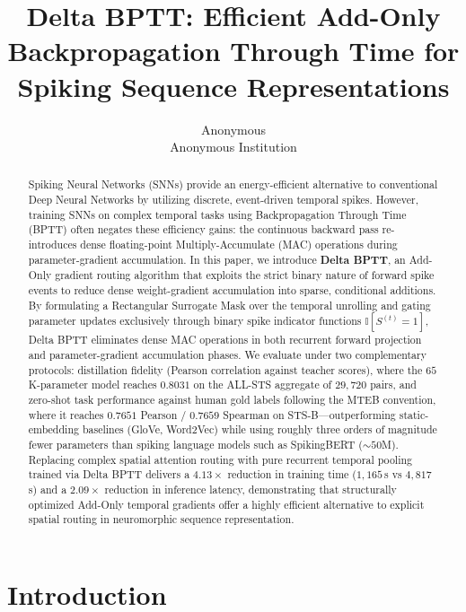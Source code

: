 \documentclass[10pt]{article} %
\title{Delta BPTT: Efficient Add-Only Backpropagation Through Time for Spiking Sequence Representations}
\author{\name Anonymous \\
      \addr Anonymous Institution}
\begin{document}
\maketitle

\begin{abstract}
Spiking Neural Networks (SNNs) provide an energy-efficient alternative to conventional Deep Neural Networks by utilizing discrete, event-driven temporal spikes. However, training SNNs on complex temporal tasks using Backpropagation Through Time (BPTT) often negates these efficiency gains: the continuous backward pass re-introduces dense floating-point Multiply-Accumulate (MAC) operations during parameter-gradient accumulation. In this paper, we introduce \textbf{Delta BPTT}, an Add-Only gradient routing algorithm that exploits the strict binary nature of forward spike events to reduce dense weight-gradient accumulation into sparse, conditional additions. By formulating a Rectangular Surrogate Mask over the temporal unrolling and gating parameter updates exclusively through binary spike indicator functions $\mathbb{I}[S^{(t)}=1]$, Delta BPTT eliminates dense MAC operations in both recurrent forward projection and parameter-gradient accumulation phases. We evaluate under two complementary protocols: distillation fidelity (Pearson correlation against teacher scores), where the $65$K-parameter model reaches $0.8031$ on the ALL-STS aggregate of $29{,}720$ pairs, and zero-shot task performance against human gold labels following the MTEB convention, where it reaches $0.7651$ Pearson / $0.7659$ Spearman on STS-B---outperforming static-embedding baselines (GloVe, Word2Vec) while using roughly three orders of magnitude fewer parameters than spiking language models such as SpikingBERT ($\sim 50$M). Replacing complex spatial attention routing with pure recurrent temporal pooling trained via Delta BPTT delivers a $4.13\times$ reduction in training time ($1{,}165$\,s vs $4{,}817$\,s) and a $2.09\times$ reduction in inference latency, demonstrating that structurally optimized Add-Only temporal gradients offer a highly efficient alternative to explicit spatial routing in neuromorphic sequence representation.
\end{abstract}

\section{Introduction}
\end{document}
